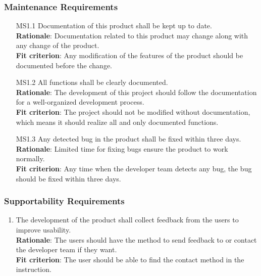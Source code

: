 \documentclass{article}
\begin{document}
\subsubsection{Maintenance Requirements}
\begin{enumerate}
    \item[MS1.1] Documentation of this product shall be kept up to date.\\
    \textbf{Rationale}: Documentation related to this product may change along with any change of the product. \\
    \textbf{Fit criterion}: Any modification of the features of the product should be documented before the change.\\
    \item[MS1.2] All functions shall be clearly documented.\\
    \textbf{Rationale}: The development of this project should follow the documentation for a well-organized development process.\\
    \textbf{Fit criterion}: The project should not be modified without documentation, which means it should realize all and only documented functions.\\
    \item[MS1.3] Any detected bug in the product shall be fixed within three days.\\
    \textbf{Rationale}: Limited time for fixing bugs ensure the product to work normally.\\
    \textbf{Fit criterion}: Any time when the developer team detects any bug, the bug should be fixed within three days.\\
\end{enumerate}
\subsubsection{Supportability Requirements}
\begin{enumerate}[MS2.1]
    \item The development of the product shall collect feedback from the users to improve usability.\\
    \textbf{Rationale}: The users should have the method to send feedback to or contact the developer team if they want. \\
    \textbf{Fit criterion}: The user should be able to find the contact method in the instruction.\\
\end{enumerate}
\end{document}
